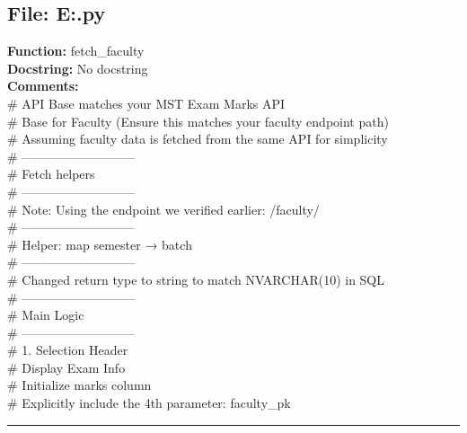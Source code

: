 {\subsection*{File: E:\project\capstone\frontend\mem.py}
\textbf{Function:} fetch_faculty\\
\textbf{Docstring:} No docstring\\
\textbf{Comments:}\\
# API Base matches your MST Exam Marks API\\
# Base for Faculty (Ensure this matches your faculty endpoint path)\\
# Assuming faculty data is fetched from the same API for simplicity\\
# ---------------------------\\
# Fetch helpers\\
# ---------------------------\\
# Note: Using the endpoint we verified earlier: /faculty/\\
# ---------------------------\\
# Helper: map semester → batch\\
# ---------------------------\\
# Changed return type to string to match NVARCHAR(10) in SQL\\
# ---------------------------\\
# Main Logic\\
# ---------------------------\\
# 1. Selection Header\\
# Display Exam Info\\
# Initialize marks column\\
# Explicitly include the 4th parameter: faculty\_pk\\

\hrule

}
